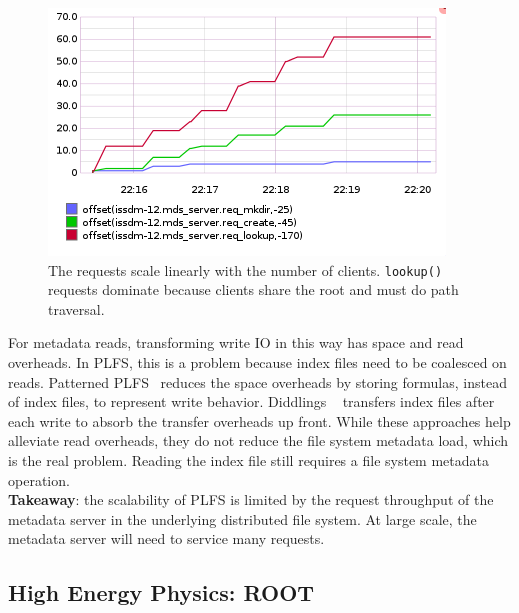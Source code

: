 \begin{figure}[tb]
\centering
  \includegraphics[width=1\linewidth]{figures/prob_reqs.png} 
  \caption{The requests scale linearly with the number of clients.
  \texttt{lookup()} requests dominate because clients share the root and must do
  path traversal.
  }\label{fig:arch}
\end{figure}

For metadata reads, transforming write IO in this way has space and read
overheads. In PLFS, this is a problem because index files need to be coalesced
on reads.  Patterned PLFS~\cite{he:hpdc13-plfs-patterns} reduces the space
overheads by storing formulas, instead of index files, to represent write
behavior. Diddlings ~\cite{grider:pc17-diddlings} transfers index files after
each write to absorb the transfer overheads up front. While these approaches
help alleviate read overheads, they do not reduce the file system metadata
load, which is the real problem. Reading the index file still requires a file
system metadata operation.\\


\noindent\textbf{Takeaway}: the scalability of PLFS is limited by the request
throughput of the metadata server in the underlying distributed file system. At
large scale, the metadata server will need to service many requests.

\subsection{High Energy Physics: ROOT}

